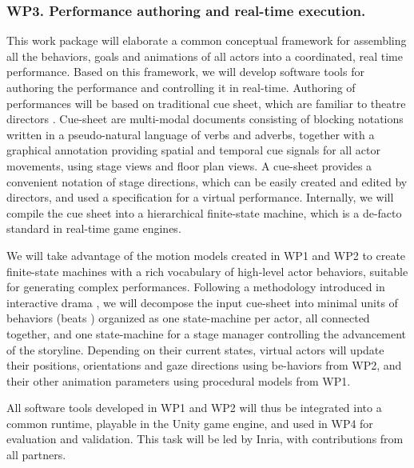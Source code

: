 
\subsubsection{WP3. Performance authoring and real-time execution. }

This work package will elaborate a common conceptual framework for assembling all the behaviors, goals and animations of all actors into a coordinated, real time performance. Based on this framework, we will develop software tools for authoring the performance and controlling it in real-time. Authoring of performances will be based on traditional cue sheet, which are familiar to theatre directors \cite{gagnere2012,ronfard2012}. Cue-sheet are multi-modal documents consisting of blocking notations  written in a pseudo-natural language of verbs and adverbs, together with a graphical annotation providing spatial and temporal cue signals  for all actor movements, using stage views and floor plan views. A cue-sheet provides a convenient notation of stage directions, which can be easily created and edited by directors, and used a specification for a virtual performance. Internally, we will compile the cue sheet into a hierarchical finite-state machine, which is a de-facto standard in real-time game engines. 

We will take advantage of the motion models created in WP1 and WP2 to create finite-state machines with a rich vocabulary of high-level actor behaviors, suitable for generating complex performances. Following a methodology introduced in interactive drama \cite{Mateas2002}, we will decompose the input cue-sheet into minimal units of behaviors (beats ) organized as one state-machine per actor, all connected together, and one state-machine for a stage manager  controlling the advancement of the storyline. Depending on their current states, virtual actors will update their positions, orientations and gaze directions using be-haviors from WP2, and their other animation parameters using procedural models from WP1. 

All software tools developed in WP1 and WP2 will thus be integrated into a common runtime, playable in the Unity game engine, and used in WP4 for evaluation and validation. This task will be led by Inria, with contributions from all partners.

\endinput

